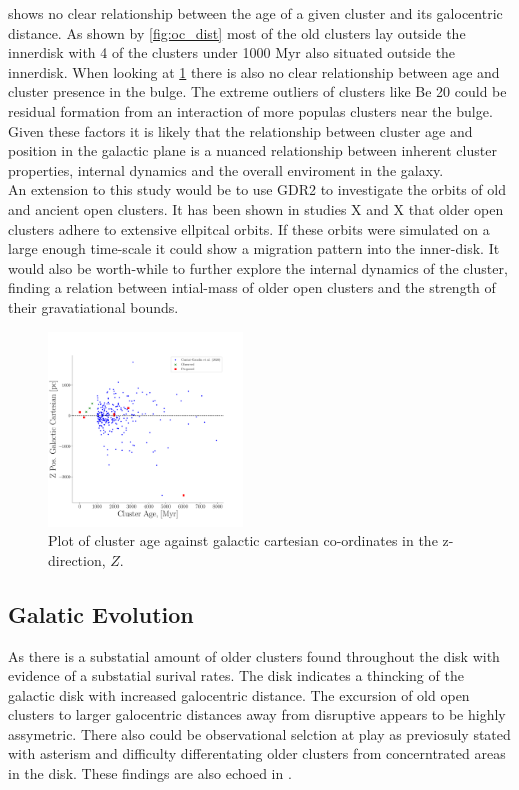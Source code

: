  shows no clear relationship between the age of a given cluster and its galocentric distance. As shown by \cref{fig:oc_dist} most of the old clusters lay outside the innerdisk with 4 of the clusters under 1000 Myr also situated outside the innerdisk. When looking at \cref{fig:agevszpos} there is also no clear relationship between age and cluster presence in the bulge. The extreme outliers of clusters like Be 20 could be residual formation from an interaction of more populas clusters near the bulge. \\ Given these factors it is likely that the relationship between cluster age and position in the galactic plane is a nuanced relationship between inherent cluster properties, internal dynamics and the overall enviroment in the galaxy. \\ An extension to this study would be to use GDR2 to investigate the orbits of old and ancient open clusters. It has been shown in studies X and X that older open clusters adhere to extensive ellpitcal orbits. If these orbits were simulated on a large enough time-scale it could show a migration pattern into the inner-disk. It would also be worth-while to further explore the internal dynamics of the cluster, finding a relation between intial-mass of older open clusters and the strength of their gravatiational bounds.

\begin{figure}[ht!]
  \centering
  \includegraphics[width = 0.46\textwidth]{figures/agevszpos.pdf}
  \caption{Plot of cluster age against galactic cartesian co-ordinates in the z-direction, $Z$.} 
  \label{fig:agevszpos}
\end{figure}


\subsection{Galatic Evolution}

As there is a substatial amount of older clusters found throughout the disk with evidence of a substatial surival rates. The disk indicates a thincking of the galactic disk with increased galocentric distance. The excursion of old open clusters to larger galocentric distances away from disruptive appears to be highly assymetric. There also could be observational selction at play as previosuly stated with asterism and difficulty differentating older clusters from concerntrated areas in the disk. These findings are also echoed in \cite{2006Bon}. 

